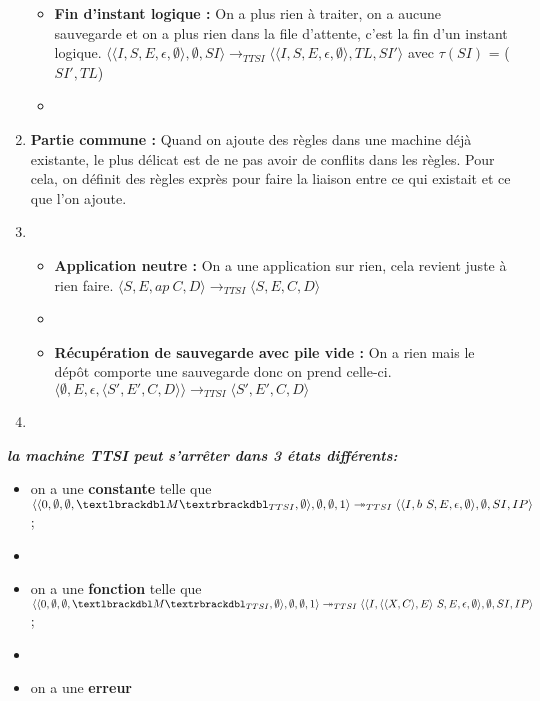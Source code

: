\documentclass[10pt,a4paper]{article}
\begin{document}
\begin{enumerate}
\begin{itemize}
						\item[] \textbf{Fin d'instant logique :} On a plus rien à traiter, on a aucune sauvegarde et on a plus rien dans la file d'attente, c'est la fin d'un instant logique.
						\smallbreak
						$\langle\langle I,S,E,\epsilon,\emptyset \rangle ,\emptyset,SI\rangle 
						\longrightarrow_{TTSI} 
						\langle\langle I,S,E,\epsilon,\emptyset\rangle,TL,SI'\rangle$
						avec $\tau(SI)$ = ($SI',TL$) 
						\item[]
						
					\end{itemize}
					\item[] \textbf{Partie commune :} Quand on ajoute des règles dans une machine déjà existante, le plus délicat est de ne pas avoir de conflits dans les règles. Pour cela, on définit des règles exprès pour faire la liaison entre ce qui existait et ce que l'on ajoute. 
					\item[]
					\begin{itemize}
						\item[] \textbf{Application neutre :} On a une application sur rien, cela revient juste à rien faire.
						\smallbreak 
						$\langle S,E,ap~C,D\rangle
						\longrightarrow_{TTSI} 
						\langle S,E,C,D\rangle$
						\item[]
						\item[] \textbf{Récupération de sauvegarde avec pile vide :}  On a rien mais le dépôt comporte une sauvegarde donc on prend celle-ci.
						\smallbreak  
						$\langle \emptyset,E,\epsilon,\langle S',E',C,D\rangle\rangle
						\longrightarrow_{TTSI} 
						\langle S',E',C,D\rangle$
					\end{itemize}
					
					\item[]
				\end{enumerate}
				\bigbreak
				\bigbreak
				
				
				\textbf{\textit{la machine TTSI peut s'arrêter dans 3 états différents:}}
				\smallbreak
				\begin{itemize}
					\item[] on a une \textbf{constante} telle que 
					$\langle\langle 0,\emptyset,\emptyset,\textlbrackdbl M\textrbrackdbl_{TTSI},\emptyset\rangle,\emptyset,\emptyset,1\rangle 
					\twoheadrightarrow_{TTSI} 
					\langle\langle I,b~S,E,\epsilon,\emptyset\rangle,\emptyset,SI,IP\rangle$;
					\item[] 
					\item[] on a une \textbf{fonction} telle que
					$\langle\langle 0,\emptyset,\emptyset,\textlbrackdbl M\textrbrackdbl_{TTSI},\emptyset\rangle,\emptyset,\emptyset,1\rangle 
					\twoheadrightarrow_{TTSI} 
					\langle\langle I,\langle\langle X,C\rangle,E\rangle~S,E,\epsilon,\emptyset\rangle,\emptyset,SI,IP\rangle$;
					\item[] 
					\item[] on a une \textbf{erreur} 
				\end{itemize}
				\newpage
	
\end{document}
